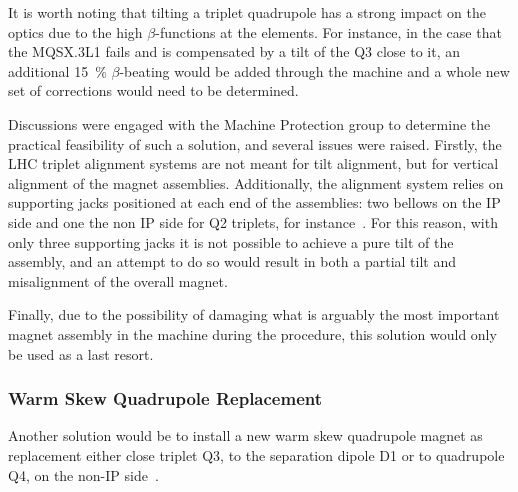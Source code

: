 It is worth noting that tilting a triplet quadrupole has a strong impact on the optics due to the high \(\beta\)-functions at the elements.
For instance, in the case that the MQSX.\num{3}L\num{1} fails and is compensated by a tilt of the Q\num{3} close to it, an additional \qty{15}{\percent} \(\beta\)-beating would be added through the machine and a whole new set of corrections would need to be determined.

Discussions were engaged with the Machine Protection group to determine the practical feasibility of such a solution, and several issues were raised.
Firstly, the LHC triplet alignment systems are not meant for tilt alignment, but for vertical alignment of the magnet assemblies.
Additionally, the alignment system relies on supporting jacks positioned at each end of the assemblies: two bellows on the IP side and one the non IP side for Q2 triplets, for instance~\cite{IPAC:Micolon:LHC_Triplet_Magnet_Supporting_System, IWAA:Durand:Remote_Positioning_LHC_Inner_Triplet}.
For this reason, with only three supporting jacks it is not possible to achieve a pure tilt of the assembly, and an attempt to do so would result in both a partial tilt and misalignment of the overall magnet.

Finally, due to the possibility of damaging what is arguably the most important magnet assembly in the machine during the procedure, this solution would only be used as a last resort.

\subsubsection*{Warm Skew Quadrupole Replacement}

Another solution would be to install a new warm skew quadrupole magnet as replacement either close triplet Q\num{3}, to the separation dipole D\num{1} or to quadrupole Q\num{4}, on the non-IP side~\cite{PRES:Persson:Integrated_Lumi_MQSX_Carryovers}.


